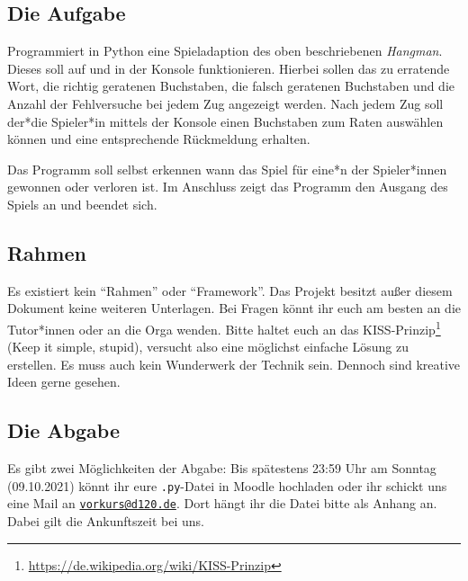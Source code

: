 \documentclass[ngerman,accentcolor=3c,colorbacktitle,12pt]{tudaexercise}
\begin{document}
\subsection*{Die Aufgabe}
Programmiert in Python eine Spieladaption des oben beschriebenen \emph{Hangman}.
Dieses soll auf und in der Konsole funktionieren.
Hierbei sollen das zu erratende Wort, die richtig geratenen Buchstaben, die falsch geratenen Buchstaben und die Anzahl der Fehlversuche bei jedem Zug angezeigt werden.
Nach jedem Zug soll der*die Spieler*in mittels der Konsole einen Buchstaben zum Raten auswählen können und eine entsprechende Rückmeldung erhalten.

Das Programm soll selbst erkennen wann das Spiel für eine*n der Spieler*innen gewonnen oder verloren ist.
Im Anschluss zeigt das Programm den Ausgang des Spiels an und beendet sich.

\clearpage
\subsection*{Rahmen}
Es existiert kein \enquote{Rahmen} oder \enquote{Framework}.
Das Projekt besitzt außer diesem Dokument keine weiteren Unterlagen.
Bei Fragen könnt ihr euch am besten an die Tutor*innen oder an die Orga wenden.
Bitte haltet euch an das KISS-Prinzip\footnote[2]{\url{https://de.wikipedia.org/wiki/KISS-Prinzip}} (Keep it simple, stupid), versucht also eine möglichst einfache Lösung zu erstellen.
Es muss auch kein Wunderwerk der Technik sein.
Dennoch sind kreative Ideen gerne gesehen.

\subsection*{Die Abgabe}
Es gibt zwei Möglichkeiten der Abgabe: Bis spätestens 23:59 Uhr am Sonntag (09.10.2021) könnt ihr eure \texttt{.py}-Datei in Moodle hochladen oder ihr schickt uns eine Mail an \href{mailto:vorkurs@d120.de}{\nolinkurl{vorkurs@d120.de}}.
Dort hängt ihr die Datei bitte als Anhang an.
Dabei gilt die Ankunftszeit bei uns.
\end{document}
